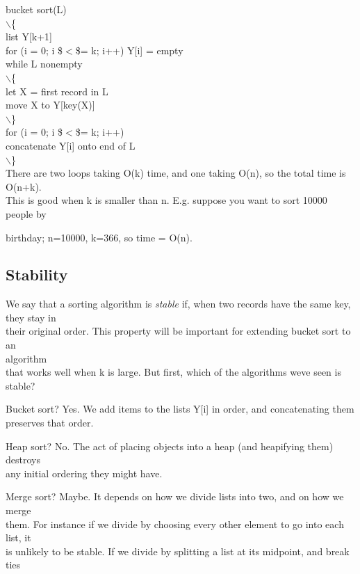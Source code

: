\documentclass[a4paper,11pt]{article}
\begin{document}
\begin{flushleft}
{
bucket sort(L)
\\ $\backslash$\{
\\ list Y[k+1]
\\ for (i = 0; i \$$<$\$= k; i++) Y[i] = empty
\\ while L nonempty
\\ $\backslash$\{
\\ let X = first record in L
\\ move X to Y[key(X)]
\\ $\backslash$\}
\\ for (i = 0; i \$$<$\$= k; i++)
\\ concatenate Y[i] onto end of L
\\ $\backslash$\}
\\ }
{
\raggedleft
There are two loops taking O(k) time, and one taking O(n), so the total time is O(n+k).
\\ This is good when k is smaller than n. E.g. suppose you want to sort 10000 people by
\\ }
{
birthday; n=10000, k=366, so time = O(n).
\\ \subsection{Stability}
}
{
\raggedleft
We say that a sorting algorithm is \textit{stable }if, when two records have the same key, they stay in
\\ their original order. This property will be important for extending bucket sort to an
\\ algorithm
\\ }
{
that works well when k is large. But first, which of the algorithms weve seen is stable?
\\ }
\begin{itemize}{
\item
Bucket sort? Yes. We add items to the lists Y[i] in order, and concatenating them
\\ preserves that order.
\item
 Heap sort? No. The act of placing objects into a heap (and heapifying them) destroys
\\ any initial ordering they might have.
\item
 Merge sort? Maybe. It depends on how we divide lists into two, and on how we merge
\\ them. For instance if we divide by choosing every other element to go into each list, it
\\ is unlikely to be stable. If we divide by splitting a list at its midpoint, and break ties
}
\end{itemize}
\end{flushleft}
\end{document}
